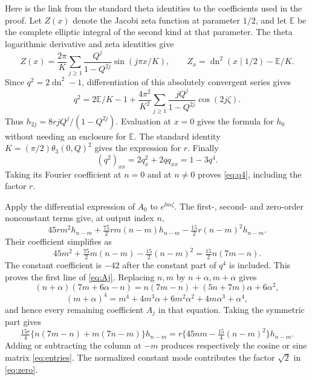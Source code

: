 Here is the link from the standard theta identities to the coefficients used
in the proof. Let $Z(x)$ denote the Jacobi zeta function at parameter $1/2$,
and let $\mathbb E$ be the complete elliptic integral of the second kind at
that parameter. The theta logarithmic derivative and zeta identities
\cite[Sections~20.5(ii), 22.16]{DLMF} give
\[
 Z(x)=\frac{2\pi}{K}\sum_{j\ge1}
       \frac{Q^j}{1-Q^{2j}}\sin(j\pi x/K),\qquad
 Z_x=\operatorname{dn}^2(x\mid1/2)-\mathbb E/K.
\]
Since $q^2=2\operatorname{dn}^2-1$, differentiation of this absolutely
convergent series gives
\[
 q^2=2\mathbb E/K-1+
       \frac{4\pi^2}{K^2}\sum_{j\ge1}
       \frac{jQ^j}{1-Q^{2j}}\cos(2j\zeta).
\]
Thus $h_{2j}=8rjQ^j/(1-Q^{2j})$. Evaluation at $x=0$ gives the
formula for $h_0$ without needing an enclosure for $\mathbb E$.
The standard identity $K=(\pi/2)\theta_3(0,Q)^2$
\cite[Section~22.2]{DLMF} gives the expression for $r$.
Finally
\[
 (q^2)_{xx}=2q_x^2+2qq_{xx}=1-3q^4.
\]
Taking its Fourier coefficient at $n=0$ and at $n\ne0$ proves
\eqref{eq:q4}, including the factor $r$.

Apply the differential expression of $A_0$ to $e^{\ii m\zeta}$.
The first-, second- and zero-order nonconstant terms give, at output index $n$,
\[
 45rm^2h_{n-m}+\tfrac{75}{2}rm(n-m)h_{n-m}
       -\tfrac{15}{2}r(n-m)^2h_{n-m}.
\]
Their coefficient simplifies as
\[
 45m^2+\tfrac{75}{2}m(n-m)-\tfrac{15}{2}(n-m)^2
 =\tfrac{15}{2}n(7m-n).
\]
The constant coefficient is $-42$ after the constant part of $q^4$ is
included. This proves the first line of \eqref{eq:Aj}.
Replacing $n,m$ by $n+\alpha,m+\alpha$ gives
\[
 (n+\alpha)(7m+6\alpha-n)
 =n(7m-n)+(5n+7m)\alpha+6\alpha^2,
\]
\[
 (m+\alpha)^4=m^4+4m^3\alpha+6m^2\alpha^2
                    +4m\alpha^3+\alpha^4,
\]
and hence every remaining coefficient $A_j$ in that equation.
Taking the symmetric part gives
\[
 \tfrac{15r}{4}\{n(7m-n)+m(7n-m)\}h_{n-m}
 =r\{45nm-\tfrac{15}{4}(n-m)^2\}h_{n-m}.
\]
Adding or subtracting the column at $-m$ produces respectively the cosine
or sine matrix \eqref{eq:entries}. The normalized constant mode contributes
the factor $\sqrt2$ in \eqref{eq:zero}.


